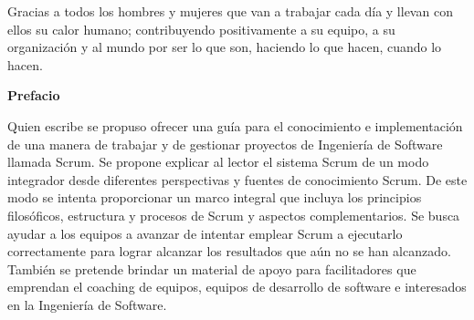 
%

\newpage

\hspace{1cm}\newline %
\vspace{5cm} %

\begin{center}
Gracias a todos los hombres y mujeres que van a trabajar cada día y llevan con ellos su calor humano; contribuyendo positivamente a su equipo, a su organización y al mundo por ser lo que son, haciendo lo que hacen, cuando lo hacen.
\end{center}

\newpage
\vspace{2cm} %
\hspace{1cm}\newline %

%

\newpage

{\large \textbf{Prefacio}}

\vspace{2cm} %

Quien escribe se propuso ofrecer una guía para el conocimiento e implementación de una manera de trabajar y de gestionar proyectos de Ingeniería de Software llamada Scrum. Se propone explicar al lector el sistema Scrum de un modo integrador desde diferentes perspectivas y fuentes de conocimiento Scrum. De este modo se intenta proporcionar un marco integral que incluya los principios filosóficos, estructura y procesos de Scrum y aspectos complementarios. Se busca ayudar a los equipos a avanzar de intentar emplear Scrum a ejecutarlo correctamente para lograr alcanzar los resultados que aún no se han alcanzado. También se pretende brindar un material de apoyo para facilitadores que emprendan el coaching de equipos, equipos de desarrollo de software e interesados en la Ingeniería de Software.

\newpage
\vspace{2cm} %
\hspace{1cm}\newline %
 
